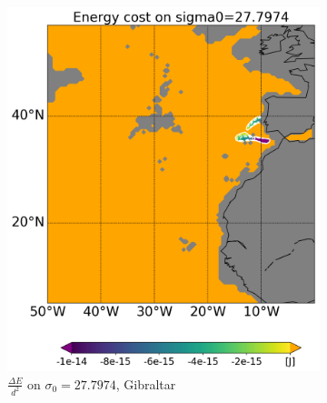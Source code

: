 \begin{figure}[htbp]
\begin{subfigure}[b]{0.4\textwidth}
         \includegraphics[width=\textwidth]{plots/energy/gibraltar_energy/Map2dcyl_neg_energy_on_sigma0_2779e-2_reg310Eto360E05Nto57N_1990to1998av_WOCE.png}
         \caption{$\frac{\Delta E}{d^2}$ on $\sigma_0 = 27.7974$, Gibraltar}
         \label{fig:subplot_gibraltar_energy_sigma_0}
     \end{subfigure}
     \hfill
      \begin{subfigure}[b]{0.4\textwidth}
         

\end{subfigure}
\end{figure}
